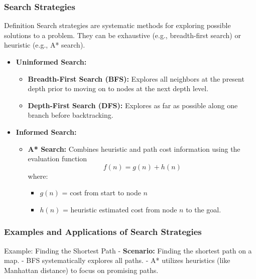 \documentclass[aspectratio=169]{beamer}
\begin{document}
\begin{frame}[fragile]
    \frametitle{Search Strategies}
    \begin{block}{Definition}
        Search strategies are systematic methods for exploring possible solutions to a problem. They can be exhaustive (e.g., breadth-first search) or heuristic (e.g., A* search).
    \end{block}

    \begin{itemize}
        \item \textbf{Uninformed Search:}
            \begin{itemize}
                \item \textbf{Breadth-First Search (BFS):} Explores all neighbors at the present depth prior to moving on to nodes at the next depth level.
                \item \textbf{Depth-First Search (DFS):} Explores as far as possible along one branch before backtracking.
            \end{itemize}

        \item \textbf{Informed Search:}
            \begin{itemize}
                \item \textbf{A* Search:} Combines heuristic and path cost information using the evaluation function
                \begin{equation}
                    f(n) = g(n) + h(n)
                \end{equation}
                where:
                \begin{itemize}
                    \item $g(n)$ = cost from start to node $n$
                    \item $h(n)$ = heuristic estimated cost from node $n$ to the goal.
                \end{itemize}
            \end{itemize}
    \end{itemize}
\end{frame}

\begin{frame}[fragile]
    \frametitle{Examples and Applications of Search Strategies}
    \begin{exampleblock}{Example: Finding the Shortest Path}
        - \textbf{Scenario:} Finding the shortest path on a map.
        - BFS systematically explores all paths.
        - A* utilizes heuristics (like Manhattan distance) to focus on promising paths.
    \end{exampleblock}
\end{frame}
\end{document}
